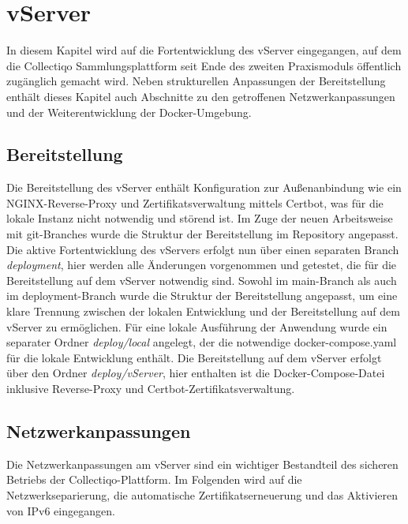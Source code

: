 \section{vServer}\label{subsec:vserver}

In diesem Kapitel wird auf die Fortentwicklung des vServer eingegangen, auf dem die Collectiqo Sammlungsplattform seit Ende des zweiten Praxismoduls öffentlich zugänglich gemacht wird.
Neben strukturellen Anpassungen der Bereitstellung enthält dieses Kapitel auch Abschnitte zu den getroffenen Netzwerkanpassungen und der Weiterentwicklung der Docker-Umgebung.

\subsection{Bereitstellung}\label{subsubsec:vserver-bereitstellung}

Die Bereitstellung des vServer enthält Konfiguration zur Außenanbindung wie ein NGINX-Reverse-Proxy und Zertifikatsverwaltung mittels Certbot, was für die lokale Instanz nicht notwendig und störend ist.
Im Zuge der neuen Arbeitsweise mit git-Branches wurde die Struktur der Bereitstellung im Repository angepasst.
Die aktive Fortentwicklung des vServers erfolgt nun über einen separaten Branch \textit{deployment}, hier werden alle Änderungen vorgenommen und getestet, die für die Bereitstellung auf dem vServer notwendig sind.
Sowohl im main-Branch als auch im deployment-Branch wurde die Struktur der Bereitstellung angepasst, um eine klare Trennung zwischen der lokalen Entwicklung und der Bereitstellung auf dem vServer zu ermöglichen.
Für eine lokale Ausführung der Anwendung wurde ein separater Ordner \textit{deploy/local} angelegt, der die notwendige docker-compose.yaml für die lokale Entwicklung enthält.
Die Bereitstellung auf dem vServer erfolgt über den Ordner \textit{deploy/vServer}, hier enthalten ist die Docker-Compose-Datei inklusive Reverse-Proxy und Certbot-Zertifikatsverwaltung.

\subsection{Netzwerkanpassungen}\label{subsubsec:vserver-netzwerk}

Die Netzwerkanpassungen am vServer sind ein wichtiger Bestandteil des sicheren Betriebs der Collectiqo-Plattform.
Im Folgenden wird auf die Netzwerkseparierung, die automatische Zertifikatserneuerung und das Aktivieren von IPv6 eingegangen.

